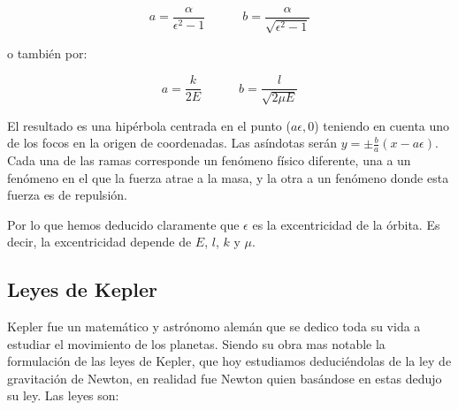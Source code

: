 \documentclass[12pt,a4paper]{book}
\begin{document}
\begin{itemize}
\begin{equation}
a = \dfrac{\alpha}{\epsilon^2-1} \quad \quad \quad b = \dfrac{\alpha}{\sqrt{\epsilon^2-1}}
\end{equation}

o también por:

\begin{equation}
a = \dfrac{k}{2E} \quad \quad \quad b = \dfrac{l}{\sqrt{2 \mu E}}
\end{equation}

El resultado es una hipérbola centrada en el punto ($a \epsilon,0$) teniendo en cuenta uno de los focos en la origen de coordenadas. Las asíndotas serán $y=\pm \frac{b}{a}(x-a \epsilon)$. Cada una de las ramas corresponde un fenómeno físico diferente, una a un fenómeno en el que la fuerza atrae a la masa, y la otra a un fenómeno donde esta fuerza es de repulsión.

\end{itemize}

Por lo que hemos deducido claramente que $\epsilon$ es la excentricidad de la órbita. Es decir, la excentricidad depende de $E$, $l$, $k$ y $\mu$. 


\subsection{Leyes de Kepler}

Kepler fue un matemático y astrónomo alemán que se dedico toda su vida a estudiar el movimiento de los planetas. Siendo su obra mas notable la formulación de las leyes de Kepler, que hoy estudiamos deduciéndolas de la ley de gravitación de Newton, en realidad fue Newton quien basándose en estas dedujo su ley. Las leyes son:
\end{document}
